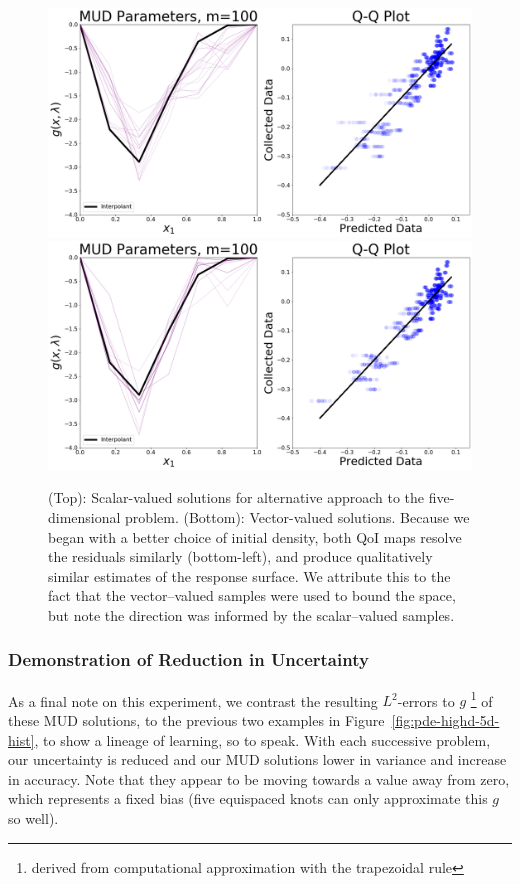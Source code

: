\begin{figure}[htbp]
\centering
  \includegraphics[width=0.95\linewidth]{figures/pde-highd/pde-highd_pair_D-alt-5-1_m100.png}
  \includegraphics[width=0.95\linewidth]{figures/pde-highd/pde-highd_pair_D-alt-5-5_m100.png}
\caption{
(Top): Scalar-valued solutions for alternative approach to the five-dimensional problem.
(Bottom): Vector-valued solutions.
Because we began with a better choice of initial density, both QoI maps resolve the residuals similarly (bottom-left), and produce qualitatively similar estimates of the response surface. We attribute this to the fact that the vector--valued samples were used to bound the space, but note the direction was informed by the scalar--valued samples.
}
\label{fig:pde-highd-5d-alt-mud}
\end{figure}
\FloatBarrier


\subsubsection{Demonstration of Reduction in Uncertainty}

As a final note on this experiment, we contrast the resulting $L^2$-errors to $g$ \footnote{derived from computational approximation with the trapezoidal rule} of these MUD solutions, to the previous two examples in Figure~\ref{fig:pde-highd-5d-hist}, to show a lineage of learning, so to speak.
With each successive problem, our uncertainty is reduced and our MUD solutions lower in variance and increase in accuracy.
Note that they appear to be moving towards a value away from zero, which represents a fixed bias (five equispaced knots can only approximate this $g$ so well).


